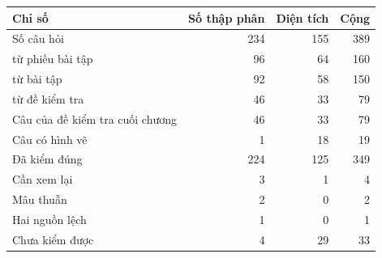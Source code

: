 \small
\begin{tabular}{@{}>{\raggedright\arraybackslash}p{3.4cm}rrr@{}}
\toprule
Chỉ số & Số thập phân & Diện tích & Cộng \\
\midrule
Số câu hỏi & 234 & 155 & 389 \\
\quad từ phiếu bài tập & 96 & 64 & 160 \\
\quad từ bài tập & 92 & 58 & 150 \\
\quad từ đề kiểm tra & 46 & 33 & 79 \\
\midrule
Câu của đề kiểm tra cuối chương & 46 & 33 & 79 \\
Câu có hình vẽ & 1 & 18 & 19 \\
\midrule
Đã kiểm đúng & 224 & 125 & 349 \\
Cần xem lại & 3 & 1 & 4 \\
Mâu thuẫn & 2 & 0 & 2 \\
Hai nguồn lệch & 1 & 0 & 1 \\
Chưa kiểm được & 4 & 29 & 33 \\
\bottomrule
\end{tabular}
